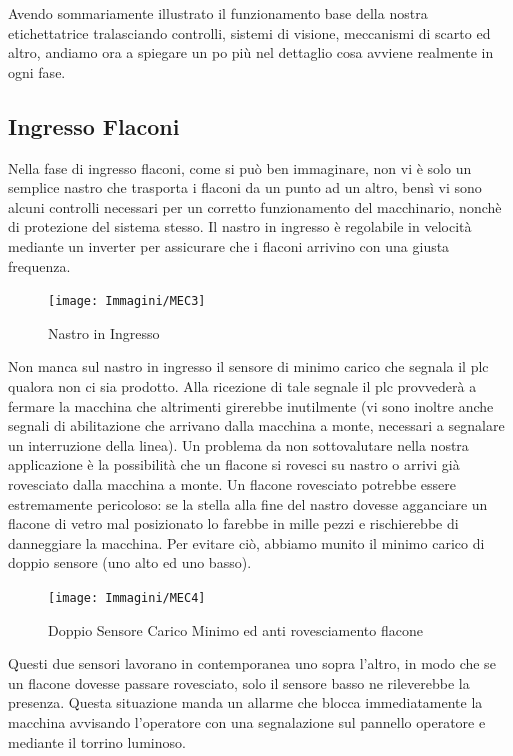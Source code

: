 \documentclass[12pt, a4paper, oneside]{book}
\begin{document}
Avendo sommariamente illustrato il funzionamento base della nostra etichettatrice tralasciando controlli, sistemi di visione, meccanismi di scarto ed altro, andiamo ora a spiegare un po più nel dettaglio cosa avviene realmente in ogni fase.

\subsection{Ingresso Flaconi}
Nella fase di ingresso flaconi, come si può ben immaginare, non vi è solo un semplice nastro che trasporta i flaconi da un punto ad un altro, bensì vi sono alcuni controlli necessari per un corretto funzionamento del macchinario, nonchè di protezione del sistema stesso. Il nastro in ingresso è regolabile in velocità mediante un inverter per assicurare che i flaconi arrivino con una giusta frequenza. 

	\begin{figure}[H]
	\centering
	\texttt{[image: Immagini/MEC3]}
	\label{mec3}
	\caption{ Nastro in Ingresso}
	\end{figure}

Non manca sul nastro in ingresso il sensore di minimo carico che segnala il plc qualora non ci sia prodotto. Alla ricezione di tale segnale il plc provvederà a fermare la macchina che altrimenti girerebbe inutilmente (vi sono inoltre anche segnali di abilitazione che arrivano dalla macchina a monte, necessari a segnalare un interruzione della linea).
Un problema da non sottovalutare nella nostra applicazione è la possibilità che un flacone si rovesci su nastro o arrivi già rovesciato dalla macchina a monte. Un flacone rovesciato potrebbe essere estremamente pericoloso: se la stella alla fine del nastro dovesse agganciare un flacone di vetro mal posizionato lo farebbe in mille pezzi e rischierebbe di danneggiare la macchina. Per evitare ciò, abbiamo munito il minimo carico di doppio sensore (uno alto ed uno basso). 

	\begin{figure}[H]
	\centering
	\texttt{[image: Immagini/MEC4]}
	\label{mec4}
	\caption{ Doppio Sensore Carico Minimo ed anti rovesciamento flacone}
	\end{figure}

Questi due sensori lavorano in contemporanea uno sopra l'altro, in modo che se un flacone dovesse passare rovesciato, solo il sensore basso ne rileverebbe la presenza. Questa situazione manda un allarme che blocca immediatamente la macchina avvisando l'operatore con una segnalazione sul pannello operatore e mediante il torrino luminoso.  
   
\end{document}
